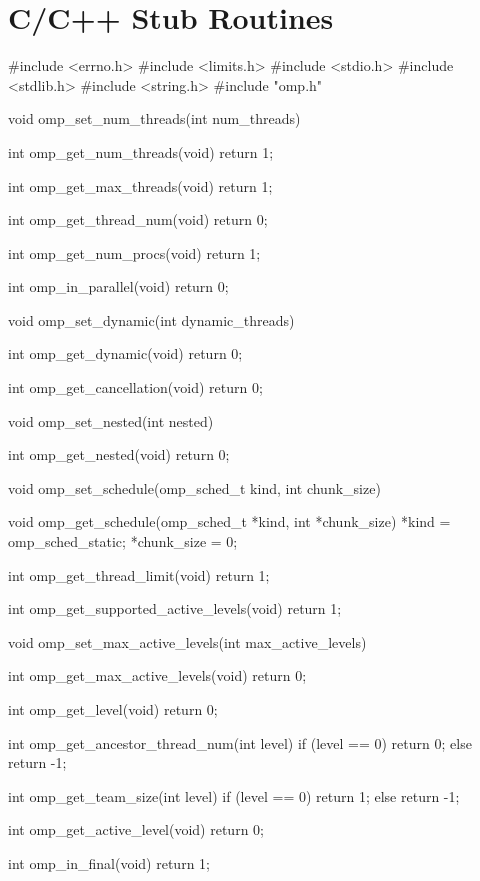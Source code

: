 \section{C/C++ Stub Routines}
\label{sec:C/C++ Stub Routines}
{\small \begin{ompcFunction}
#include <errno.h>
#include <limits.h>
#include <stdio.h>
#include <stdlib.h>
#include <string.h>
#include "omp.h"

void omp_set_num_threads(int num_threads)
{
}

int omp_get_num_threads(void)
{
  return 1;
}

int omp_get_max_threads(void)
{
  return 1;
}

int omp_get_thread_num(void)
{
  return 0;
}

int omp_get_num_procs(void)
{
  return 1;
}

int omp_in_parallel(void)
{
  return 0;
}

void omp_set_dynamic(int dynamic_threads)
{
}

int omp_get_dynamic(void)
{
  return 0;
}

int omp_get_cancellation(void)
{
  return 0;
}

void omp_set_nested(int nested)
{
}

int omp_get_nested(void)
{
  return 0;
}

void omp_set_schedule(omp_sched_t kind, int chunk_size)
{
}

void omp_get_schedule(omp_sched_t *kind, int *chunk_size)
{
  *kind = omp_sched_static;
  *chunk_size = 0;
}

int omp_get_thread_limit(void)
{
  return 1;
}

int omp_get_supported_active_levels(void)
{
  return 1;
}

void omp_set_max_active_levels(int max_active_levels)
{
}

int omp_get_max_active_levels(void)
{
  return 0;
}

int omp_get_level(void)
{
  return 0;
}

int omp_get_ancestor_thread_num(int level)
{
  if (level == 0)
  {
    return 0;
  }
  else
  {
    return -1;
  }
}

int omp_get_team_size(int level)
{
  if (level == 0)
  {
    return 1;
  }
  else
  {
    return -1;
  }
}

int omp_get_active_level(void)
{
  return 0;
}

int omp_in_final(void)
{
  return 1;
}


\end{ompcFunction}}

